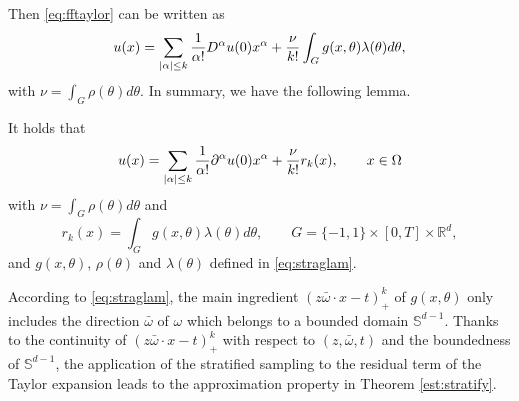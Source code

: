 Then \eqref{eq:fftaylor} can be written as 
\begin{equation}
u(x) = \sum_{|\alpha|\le k}{1\over \alpha!}D^\alpha u(0) x^\alpha
+ {\nu\over k!}\int_G  g(x, \theta)\lambda(\theta)d\theta,  
\end{equation}   
with $\nu=\int_G \rho(\theta)d\theta$. In summary, we have the following lemma.
 


\begin{lemma}\label{lm:probabilityexpan}
It holds that
\begin{equation}\label{ReLUm}
u(x) = \sum_{|\alpha|\le k}{1\over \alpha!} \partial^\alpha u(0) x^\alpha
+ {\nu\over k!}r_k(x),\qquad x\in \Omega
\end{equation}  
with $\nu=\int_G \rho(\theta)d\theta$ and 
\begin{equation}\label{ReLUrm}
r_k(x) = \int_G  g(x, \theta)\lambda(\theta)d\theta,\qquad G=\{-1,1\}\times [0,T]\times \mathbb{R}^{d},
\end{equation}  
and  $g(x,\theta)$, $\rho(\theta)$  and $\lambda(\theta)$ defined in \eqref{eq:straglam}.
\end{lemma}

According to \eqref{eq:straglam}, the main ingredient $(z\bar
\omega\cdot x - t)_+^k$ of $g(x,\theta)$ only includes the direction
$\bar\omega$ of $\omega$ which belongs to a bounded domain
$\mathbb{S}^{d-1}$. Thanks to the continuity of $(z\bar \omega\cdot x
- t)_+^k$ with respect to $(z, \bar\omega, t)$ and the boundedness of
$\mathbb{S}^{d-1}$, the application of the stratified sampling to the
residual term of the Taylor expansion leads to the 
approximation property in Theorem \ref{est:stratify}.

